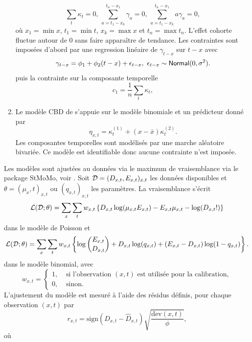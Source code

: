 \begin{ex}
\begin{enumerate}
  $$
\sum_{t}\kappa_t = 0\text{, }\sum_{a=t_1-x_k}^{t_n-x_1}\gamma_a=0\text{, }\sum_{a=t_1-x_k}^{t_n-x_1}a\gamma_a=0,
$$
où $x_1 = \min x$, $t_1=\min t$, $x_k = \max x$ et $t_n = \max t_n$. L'effet cohorte fluctue autour de $0$ sans faire apparaître de tendance. Les contraintes sont imposées d'abord par une regression linéaire de $\gamma_{t-x}$ sur $t-x$ avec 
$$
\gamma_{t-x} = \phi_1 + \phi_2(t-x) + \epsilon_{t-x},\text{ }\epsilon_{t-x}\sim\mathsf{Normal}(0,\sigma^2).
$$
puis la contrainte sur la composante temporelle
$$
c_1 = \frac{1}{n}\sum_t\kappa_t,
$$
\item Le modèle CBD de \citet{Cairns2006} s'appuie sur le modèle binomiale et un prédicteur donné par 
$$
\eta_{x,t} = \kappa_t^{(1)} + (x-\bar{x})\kappa_t^{(2)}.
$$
Les composantes temporelles sont modélisés par une marche aléatoire bivariée. Ce modèle est identifiable donc aucune contrainte n'est imposée.
\end{enumerate}
\end{ex}
Les modèles sont ajustées au données via le maximum de vraisemblance via le package StMoMo, voir \citet{Villegas2018}. Soit $\mathcal{D} = (D_{x,t}, E_{x,t})_{x,t}$ les données disponibles et $\theta = (\mu_x,t)_{x,t}\text{ ou }(q_{x,t})_{x,t}$ les paramètres. La vraisemblance s'écrit 
$$
\mathcal{L}(\mathcal{D};\theta) = \sum_x\sum_t w_{x,t}\left\{D_{x,t}\log(\mu_{x,t}E_{x,t})-E_{x,t}\mu_{x,t}-\log(D_{x,t}!)\right\}
$$
dans le modèle de Poisson et 
$$
\mathcal{L}(\mathcal{D};\theta) = \sum_x\sum_t w_{x,t}\left\{\log\binom{E_{x,t}}{D_{x,t}} + D_{x,t}\log(q_{x,t}) + (E_{x,t} - D_{x,t})\log(1-q_{x,t})\right\}.
$$
dans le modèle binomial, avec 
$$
w_{x,t} = \begin{cases}
1,& \text{ si l'observation } (x,t)\text{ est utilisée pour la calibration},\\
0,& \text{ sinon.}
\end{cases}
$$
L'ajustement du modèle est mesuré à l'aide des résidus définis, pour chaque observation $(x,t)$ par 
$$
r_{x,t} = \text{sign}(D_{x,t} - \widehat{D}_{x,t})\sqrt{\frac{\text{dev}(x,t)}{\phi}},
$$
où 
